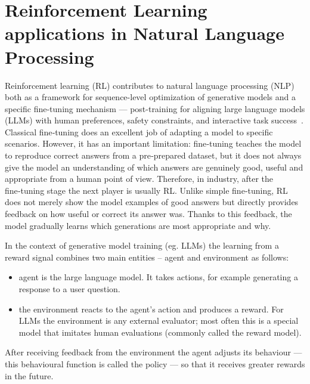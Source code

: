 \documentclass{article}
\numberwithin{equation}{section}
\begin{document}
\section{Reinforcement Learning applications in Natural Language Processing}

Reinforcement learning (RL) contributes to natural language processing (NLP) both as a framework for sequence-level optimization of generative models and a specific fine-tuning mechanism --- post-training for aligning large language models (LLMs) with human preferences, safety constraints, and interactive task success~\cite{uc_cetina2023rl_nlp_survey}. Classical fine‑tuning does an excellent job of adapting a model to specific scenarios.  However, it has an important limitation: fine‑tuning teaches the model to reproduce correct answers from a pre‑prepared dataset, but it does not always give the model an understanding of which answers are genuinely good, useful and appropriate from a human point of view.  Therefore, in industry, after the fine‑tuning stage the next player is usually RL. Unlike simple fine‑tuning, RL does not merely show the model examples of good answers but directly provides feedback on how useful or correct its answer was.  Thanks to this feedback, the model gradually learns which generations are most appropriate and why.

In the context of generative model training (eg. LLMs) the learning from a reward signal combines two main entities -- agent and environment as follows:
\begin{itemize}
  \item agent is the large language model.  It takes actions, for example generating a response to a user question.
  \item the environment reacts to the agent's action and produces a reward. For LLMs the environment is any external evaluator; most often this is a special model that imitates human evaluations (commonly called the reward model).
\end{itemize}
After receiving feedback from the environment the agent adjusts its behaviour --- this behavioural function is called the policy --- so that it receives greater rewards in the future.
\end{document}
